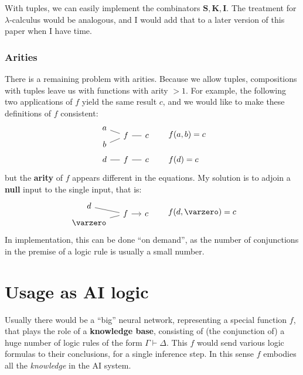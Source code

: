 With tuples, we can easily implement the combinators $\mathbf{S}, \mathbf{K}, \mathbf{I}$.  The treatment for $\lambda$-calculus would be analogous, and I would add that to a later version of this paper when I have time.

\subsubsection*{Arities}

There is a remaining problem with arities.  Because we allow tuples, compositions with tuples leave us with functions with arity $> 1$.  For example, the following two applications of $f$ yield the same result $c$, and we would like to make these definitions of $f$ consistent:
\begin{eqnarray}
\begin{tikzcd}[column sep=small, row sep=-0.5em]
a \arrow[-, dr] & & \\
& f \arrow[-, r] & c\\
b \arrow[-, ur] & &
\end{tikzcd} 
& \qquad f(a,b) = c \\
\begin{tikzcd}[column sep=small]
d \arrow[-, r] & f \arrow[-, r] & c
\end{tikzcd} 
& \qquad f(d) = c
\nonumber 
\end{eqnarray}
but the \textbf{arity} of $f$ appears different in the equations.  My solution is to adjoin a \textbf{null} input to the single input, that is:
\begin{equation}
\begin{tikzcd}[column sep=small, row sep=-0.5em]
d \arrow[-, dr] & & \\
& f \arrow[r] & c\\
\varzero \arrow[-, ur] & &
\end{tikzcd}
\qquad f(d, \varzero) = c
\end{equation}
In implementation, this can be done ``on demand'', as the number of conjunctions in the premise of a logic rule is usually a small number.

\section{Usage as AI logic}

Usually there would be a ``big'' neural network, representing a special function $f$, that plays the role of a \textbf{knowledge base}, consisting of (the conjunction of) a huge number of logic rules of the form $\Gamma \vdash \Delta$.  This $f$ would send various logic formulas to their conclusions, for a single inference step.  In this sense $f$ embodies all the \textit{knowledge} in the AI system.

